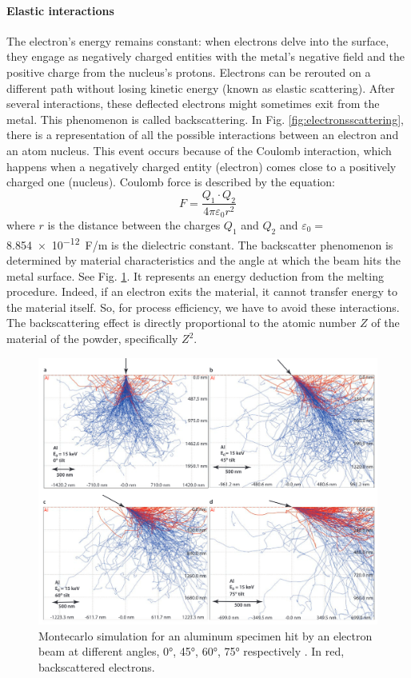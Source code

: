 \paragraph{Elastic interactions} The electron's energy remains constant: when electrons delve into the surface, they engage as negatively charged entities with the metal's negative field and the positive charge from the nucleus's protons. Electrons can be rerouted on a different path without losing kinetic energy (known as elastic scattering). After several interactions, these deflected electrons might sometimes exit from the metal. This phenomenon is called backscattering. In Fig. \ref{fig:electronsscattering}, there is a representation of all the possible interactions between an electron and an atom nucleus. This event occurs because of the Coulomb interaction, which happens when a negatively charged entity (electron) comes close to a positively charged one (nucleus). Coulomb force is described by the equation:
\begin{equation}
    \label{eq:coulomb}
    F=\frac{Q_1\cdot Q_2}{4\pi \varepsilon_0 r^2}
\end{equation}
where $r$ is the distance between the charges $Q_1$ and $Q_2$ and $\varepsilon_0=$ \SI{8.854e-12}{\farad / \metre} is the dielectric constant. The backscatter phenomenon is determined by material characteristics and the angle at which the beam hits the metal surface. See Fig. \ref{fig:backscattering}. It represents an energy deduction from the melting procedure. Indeed, if an electron exits the material, it cannot transfer energy to the material itself. So, for process efficiency, we have to avoid these interactions. The backscattering effect is directly proportional to the atomic number $Z$ of the material of the powder, specifically $Z^2$.
\begin{figure}
    \centering
    \includegraphics[scale=0.4]{Images/backscattering.png}
    \caption[Backscattering of an electron at different angles.]{Montecarlo simulation for an aluminum specimen hit by an electron beam at different angles, \ang{0}, \ang{45}, \ang{60}, \ang{75} respectively \cite{goldstein_scanning_2018}. In red, backscattered electrons.}
    \label{fig:backscattering}
\end{figure}
